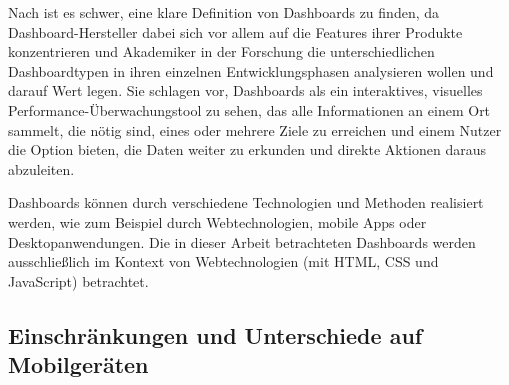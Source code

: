 Nach \autocite[S. 44]{Yigitbasioglu.AReviewOfDashboardsInPerformanceManagement.2012} ist es schwer, eine klare Definition von Dashboards zu finden, da Dashboard-Hersteller dabei sich vor allem auf die Features ihrer Produkte konzentrieren und Akademiker in der Forschung die unterschiedlichen Dashboardtypen in ihren einzelnen Entwicklungsphasen analysieren wollen und darauf Wert legen.
Sie schlagen vor, Dashboards als ein interaktives, visuelles Performance-Überwachungstool zu sehen, das alle Informationen an einem Ort sammelt, die nötig sind, eines oder mehrere Ziele zu erreichen und einem Nutzer die Option bieten, die Daten weiter zu erkunden und direkte Aktionen daraus abzuleiten.

Dashboards können durch verschiedene Technologien und Methoden realisiert werden, wie zum Beispiel durch Webtechnologien, mobile Apps oder Desktopanwendungen.
Die in dieser Arbeit betrachteten Dashboards werden ausschließlich im Kontext von Webtechnologien (mit HTML, CSS und JavaScript) betrachtet.

\subsection{Einschränkungen und Unterschiede auf Mobilgeräten}
